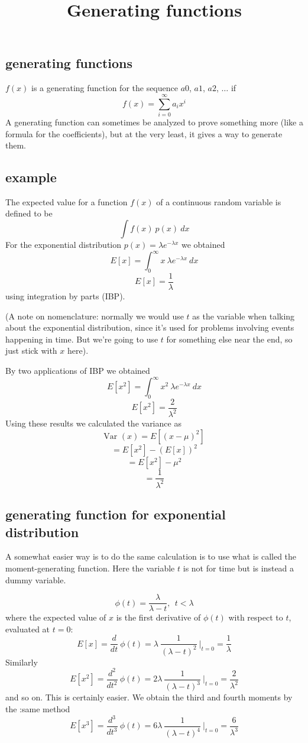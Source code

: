 \documentclass[11pt, oneside]{article}
\title{Generating functions}
\date{}
\begin{document}
\maketitle
\Large

\subsection*{generating functions}

$f(x)$ is a generating function for the sequence $a0$, $a1$, $a2$, $\dots$ if
\[ f(x) = \sum_{i = 0}^{\infty} a_i x^i \]
A generating function can sometimes be analyzed to prove something more (like a formula for the coefficients), but at the very least, it gives a way to generate them.

\subsection*{example}

The expected value for a function $f(x)$ of a continuous random variable is defined to be
\[ \int f(x) \ p(x) \ dx \]
For the exponential distribution $p(x) = \lambda e^{-\lambda x}$ we obtained
\[ E[x] = \int_0^{\infty} x \  \lambda e^{-\lambda x} \ dx \]
\[ E[x] = \frac{1}{\lambda} \]
using integration by parts (IBP).

(A note on nomenclature:  normally we would use $t$ as the variable when talking about the exponential distribution, since it's used for problems involving events happening in time.  But we're going to use $t$ for something else near the end, so just stick with $x$ here).

By two applications of IBP we obtained
\[ E[x^2] = \int_0^{\infty} x^2 \  \lambda e^{-\lambda x} \ dx \]
\[ E[x^2] = \frac{2}{\lambda^2} \]
Using these results we calculated the variance as
\[ \text{Var }(x) = E [(x - \mu)^2 ] \]
\[ = E[x^2] - (E[x])^2 \]
\[ = E[x^2] - \mu^2 \]
\[ = \frac{1}{\lambda^2} \]

\subsection*{generating function for exponential distribution}
A somewhat easier way is to do the same calculation is to use what is called the moment-generating function.  Here the variable $t$ is not for time but is instead a dummy variable.

\[ \phi(t) = \frac{\lambda}{\lambda - t}, \ \ t < \lambda \]
where the expected value of $x$ is the first derivative of $\phi(t)$ with respect to $t$, evaluated at $t=0$:
\[ E[x] = \frac{d}{dt} \ \phi(t) = \lambda \ \frac{1}{(\lambda - t)^2} \ \bigg |_{t=0} = \frac{1}{\lambda} \]
Similarly
\[ E[x^2] = \frac{d^2}{dt^2} \ \phi(t) = 2 \lambda \ \frac{1}{(\lambda - t)^3} \ \bigg |_{t=0}  = \frac{2}{\lambda^2}  \]
and so on.
This is certainly easier.  We obtain the third and fourth moments by the :same method
\[ E[x^3] = \frac{d^3}{dt^3} \ \phi(t) = 6 \lambda \ \frac{1}{(\lambda - t)^4} \ \bigg |_{t=0}  = \frac{6}{\lambda^3}  \]
\end{document}
